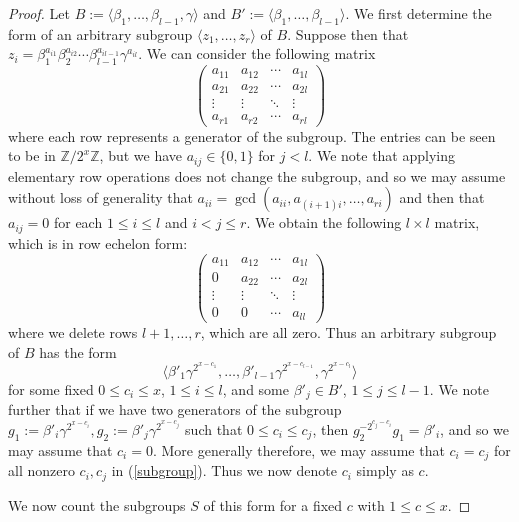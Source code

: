 \documentclass[a4paper,reqno]{amsart}
\theoremstyle{definition}
\begin{document}
\begin{proof}
    Let $B:=\langle \beta_1,\ldots,\beta_{l-1},\gamma\rangle$ and $B':=\langle \beta_1,\ldots,\beta_{l-1}\rangle$. We first determine the form of an arbitrary subgroup $\langle z_1,\ldots, z_r \rangle$ of $B$. Suppose then that $z_i=\beta_1^{a_{i1}}\beta_2^{a_{i2}}\cdots\beta_{l-1}^{a_{il-1}}\gamma^{a_{il}}$. We can consider the following matrix
    \[\begin{pmatrix}
        a_{11} & a_{12} & \cdots & a_{1l}\\
        a_{21} & a_{22} & \cdots & a_{2l}\\
        \vdots & \vdots & \ddots & \vdots\\
        a_{r1} & a_{r2} & \cdots & a_{rl}
    \end{pmatrix}\]
    where each row represents a generator of the subgroup. The entries can be seen to be in $\mathbb{Z}/2^x\mathbb{Z}$, but we have $a_{ij} \in \{0,1\}$ for $j<l$. We note that applying elementary row operations does not change the subgroup, and so we may assume without loss of generality that $a_{ii}=\gcd(a_{ii},a_{(i+1)i},\ldots,a_{ri})$ and then that $a_{ij}=0$ for each $1 \leq i \leq l$ and $i<j \leq r$. We obtain the following $l \times l$ matrix, which is in row echelon form:
    \[\begin{pmatrix}
        a_{11} & a_{12} & \cdots & a_{1l}\\
        0 & a_{22} & \cdots & a_{2l}\\
        \vdots & \vdots & \ddots & \vdots\\
        0 & 0 & \cdots & a_{ll}
    \end{pmatrix}\]
    where we delete rows $l+1,\ldots,r$, which are all zero. Thus an arbitrary subgroup of $B$ has the form
\begin{equation}\label{subgroup}
    \langle \beta'_1\gamma^{2^{x-c_1}},\ldots,\beta'_{l-1}\gamma^{2^{x-c_{l-1}}},\gamma^{2^{x-c_l}}\rangle
\end{equation}
    for some fixed $0 \leq c_i \leq x$, $1\leq i \leq l$, and some $\beta'_j \in B'$, $1 \leq j \leq l-1$. We note further that if we have two generators of the subgroup $g_1:=\beta'_i\gamma^{2^{x-c_i}}, g_2:=\beta'_j\gamma^{2^{x-c_j}}$ such that $0 \leq c_i \leq c_j$, then $g_2^{-2^{c_j-c_i}}g_1=\beta'_i$, and so we may assume that $c_i=0$. More generally therefore, we may assume that $c_i=c_j$ for all nonzero $c_i,c_j$ in (\ref{subgroup}). Thus we now denote $c_i$ simply as $c$.
 
    We now count the subgroups $S$ of this form for a fixed $c$ with $1 \leq c \leq x$.


\end{proof}
\end{document}
